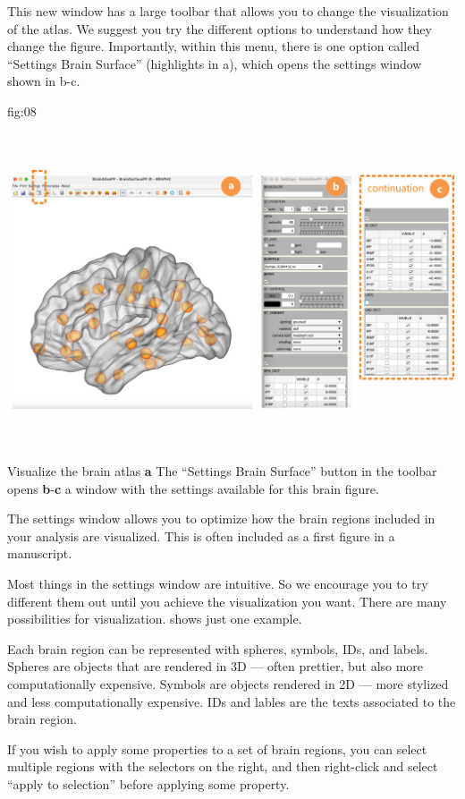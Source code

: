 \documentclass[justified]{tufte-handout}
\begin{document}
This new window has a large toolbar that allows you to change the visualization of the atlas. We suggest you try the different options to understand how they change the figure. Importantly, within this menu, there is one option called ``Settings Brain Surface'' (highlights in a), which opens the settings window shown in b-c.

	{fig:08}
	{\includegraphics[height=10cm]{tut_ba/fig08.png}}
	{Visualize the brain atlas}
	{
	{\bf a} The ``Settings Brain Surface'' button in the toolbar opens {\bf b}-{\bf c} a window with the settings available for this brain figure.
	}

The settings window allows you to optimize how the brain regions included in your analysis are visualized. This is often included as a first figure in a manuscript.

Most things in the settings window are intuitive. So we encourage you to try different them out until you achieve the visualization you want. There are many possibilities for visualization.  shows just one example.

Each brain region can be represented with spheres, symbols, IDs, and labels.
Spheres are objects that are rendered in 3D --- often prettier, but also more computationally expensive.
Symbols are objects rendered in 2D --- more stylized and less computationally expensive.
IDs and lables are the texts associated to the brain region.

If you wish to apply some properties to a set of brain regions, you can select multiple regions with the selectors on the right, and then right-click and select ``apply to selection'' before applying some property.
\end{document}
